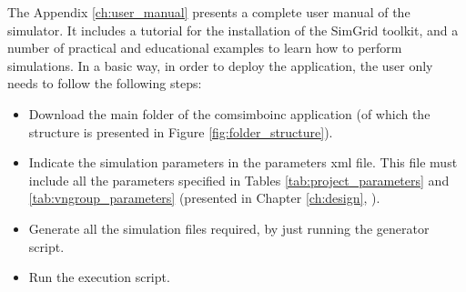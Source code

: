 \begin{itemize}
\end{itemize}


The Appendix \ref{ch:user_manual} presents a complete user manual of the simulator. It includes a tutorial for the installation of the SimGrid toolkit, and a number of practical and educational examples to learn how to perform simulations. In a basic way, in order to deploy the application, the user only needs to follow the following steps:

\begin{itemize}

\item Download the main folder of the \gls{comsimboinc} application (of which the structure is presented in Figure \ref{fig:folder_structure}).

\item Indicate the simulation parameters in the parameters \gls{xml} file. This file must include all the parameters specified in Tables \ref{tab:project_parameters} and \ref{tab:vngroup_parameters} (presented in Chapter \ref{ch:design}, \textit{}).

\item Generate all the simulation files required, by just running the generator script.

\item Run the execution script.

\end{itemize}

\afterpage{\blankpage} %
